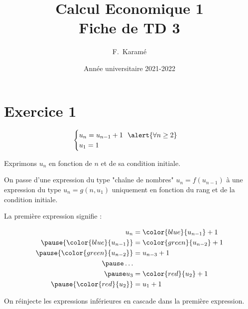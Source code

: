 \documentclass[9pt,professionalfonts,handout,hyperref]{beamer}
\title{Calcul Economique 1\\Fiche de TD 3}
\author{F.~Karamé}
\date{Année universitaire 2021-2022}
\begin{document}
\begin{frame}
  \titlepage
\end{frame}

\section{Exercice 1}


\begin{frame}

    \[
      \begin{cases}
        u_n = u_{n-1} + 1~~\alert{\forall n \ge 2}\\
        u_1 = 1
      \end{cases}
    \]

    \pause Exprimons $u_n$ en fonction de $n$ et de sa condition initiale.\newline

    \pause On passe d'une expression du type "chaîne de nombres" $u_n = f(u_{n-1})$ \pause à une expression du type $u_n = g(n,u_1)$ uniquement en fonction du rang et de la condition initiale.\newline

    \pause La première expression signifie :

    \[\begin{aligned}
        u_n &= {\color{blue}{{u_{n-1}}}} + 1\\
        \pause {\color{blue}{u_{n-1}}} &= {\color{green}{u_{n-2}}} + 1\\
        \pause {\color{green}{u_{n-2}}} &= u_{n-3} + 1\\
        \pause \dots\\
        \pause u_{3} &= {\color{red}{u_{2}}} + 1\\
        \pause {\color{red}{u_{2}}} &= u_{1} + 1
      \end{aligned}\]

    \pause On réinjecte les expressions inférieures en cascade dans la première expression.

  \end{frame}
\end{document}
